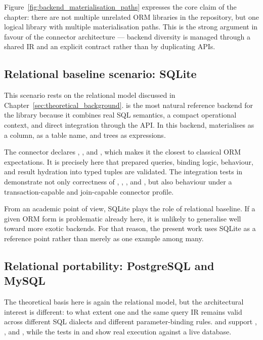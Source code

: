 Figure~\ref{fig:backend_materialisation_paths} expresses the core claim of the chapter: there are not multiple unrelated ORM libraries in the repository, but one logical library with multiple materialisation paths. This is the strong argument in favour of the connector architecture --- backend diversity is managed through a shared IR and an explicit contract rather than by duplicating APIs.

\subsection{Relational baseline scenario: SQLite}

This scenario rests on the relational model discussed in Chapter~\ref{sec:theoretical_background}.  is the most natural reference backend for the library because it combines real SQL semantics, a compact operational context, and direct integration through the  API. In this backend,  materialises as a column,  as a table name, and  trees as  expressions.

The connector declares , , and , which makes it the closest to classical ORM expectations. It is precisely here that prepared queries, binding logic,  behaviour, and result hydration into typed tuples are validated. The integration tests in  demonstrate not only correctness of , , , and , but also behaviour under a transaction-capable and join-capable connector profile.

From an academic point of view, SQLite plays the role of relational baseline. If a given ORM form is problematic already here, it is unlikely to generalise well toward more exotic backends. For that reason, the present work uses SQLite as a reference point rather than merely as one example among many.

\subsection{Relational portability: PostgreSQL and MySQL}

The theoretical basis here is again the relational model, but the architectural interest is different: to what extent one and the same query IR remains valid across different SQL dialects and different parameter-binding rules.  and  support , , and , while the tests in  and  show real execution against a live database.

